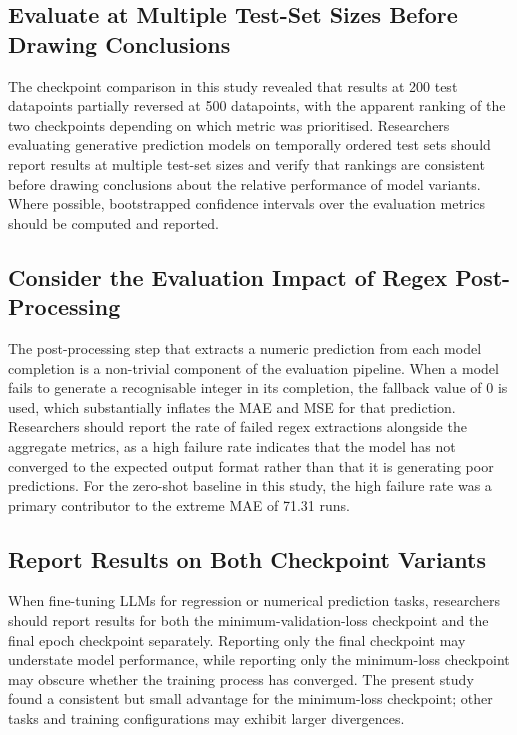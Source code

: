 \subsection{Evaluate at Multiple Test-Set Sizes Before Drawing Conclusions}

The checkpoint comparison in this study revealed that results at 200 test datapoints partially reversed at 500 datapoints, with the apparent ranking of the two checkpoints depending on which metric was prioritised. Researchers evaluating generative prediction models on temporally ordered test sets should report results at multiple test-set sizes and verify that rankings are consistent before drawing conclusions about the relative performance of model variants. Where possible, bootstrapped confidence intervals over the evaluation metrics should be computed and reported.

\subsection{Consider the Evaluation Impact of Regex Post-Processing}

The post-processing step that extracts a numeric prediction from each model completion is a non-trivial component of the evaluation pipeline. When a model fails to generate a recognisable integer in its completion, the fallback value of 0 is used, which substantially inflates the MAE and MSE for that prediction. Researchers should report the rate of failed regex extractions alongside the aggregate metrics, as a high failure rate indicates that the model has not converged to the expected output format rather than that it is generating poor predictions. For the zero-shot baseline in this study, the high failure rate was a primary contributor to the extreme MAE of 71.31 runs.

\subsection{Report Results on Both Checkpoint Variants}

When fine-tuning LLMs for regression or numerical prediction tasks, researchers should report results for both the minimum-validation-loss checkpoint and the final epoch checkpoint separately. Reporting only the final checkpoint may understate model performance, while reporting only the minimum-loss checkpoint may obscure whether the training process has converged. The present study found a consistent but small advantage for the minimum-loss checkpoint; other tasks and training configurations may exhibit larger divergences.

